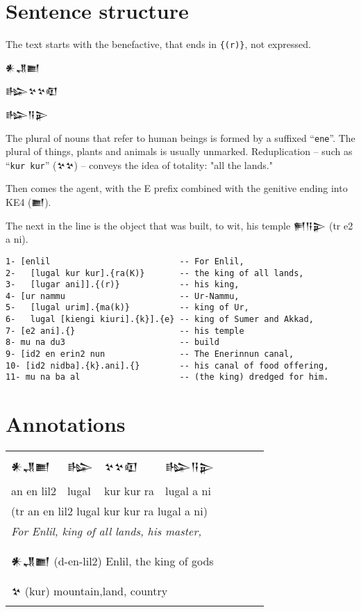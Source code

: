\documentclass[a4paper,12pt]{book}
\newcommand{\fcn}{\setmainfont{Akkadian.otf}}
\newcommand{\fcm}{\large\setmainfont{Akkadian.otf}}
\newcommand{\fsm}{\Large\setmainfont{Akkadian.otf}}
\begin{document}
\newpage
\section{Sentence structure}
The text starts with the benefactive,
that ends in \verb|{(r)}|, not expressed.

{\fsm 𒀭𒂗𒆤

𒈗𒆳𒆳𒊏

𒈗𒀀𒉌} 

The plural of nouns that refer to human beings
is formed by a suffixed ``\verb|ene|''. The plural of things,
plants and animals is usually unmarked.
Reduplication
-- such as ``\verb|kur kur|'' ({\fcn 𒆳𒆳}) --
conveys the idea of totality: "all the lands."

Then comes the agent, with the E prefix
combined with the genitive ending
into KE4 ({\fcn 𒆤}).

The next in the line is the object that
was built, to wit, his temple {\fcn 𒂍𒀀𒉌}
(tr e2 a ni).
\begin{verbatim}
1- [enlil                          -- For Enlil,
2-   [lugal kur kur].{ra(K)}       -- the king of all lands,
3-   [lugar ani]].{(r)}            -- his king,
4- [ur nammu                       -- Ur-Nammu,
5-   [lugal urim].{ma(k)}          -- king of Ur,
6-   lugal [kiengi kiuri].{k}].{e} -- king of Sumer and Akkad,
7- [e2 ani].{}                     -- his temple
8- mu na du3                       -- build
9- [id2 en erin2 nun               -- The Enerinnun canal,
10- [id2 nidba].{k}.ani].{}        -- his canal of food offering,
11- mu na ba al                    -- (the king) dredged for him.
\end{verbatim}

\section{Annotations}

\begin{tabular}[!h]{l l l l l l l l}
  \fcm 𒀭𒂗𒆤 &\fcm 𒈗 &\fcm 𒆳𒆳𒊏 &\fcm 𒈗𒀀𒉌\\
  an en lil2  & lugal     & kur kur ra & lugal a ni\\
  \multicolumn{4}{l}{(tr an en lil2 lugal kur kur ra lugal a ni) }\\
  \multicolumn{4}{l}{\em For Enlil, king of all lands, his master,}\\
  \hline\\
  \multicolumn{4}{l}{{\fcm 𒀭𒂗𒆤}
     (d-en-lil2) Enlil, the king of gods}\\
  \multicolumn{4}{l}{{\fcm 𒆳}  (kur) mountain,land, country}\\
\end{tabular}
\index{kur {\fcn 𒆳} ! mountain, land, country}
\end{document}
